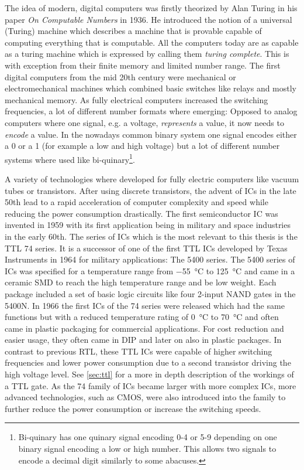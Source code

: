 The idea of modern, digital computers was firstly theorized by Alan Turing in his paper \emph{On Computable Numbers} in 1936. \cite{10.1112/plms/s2-42.1.230}
He introduced the notion of a universal (Turing) machine which describes a machine that is provable capable of computing everything that is computable.
All the computers today are as capable as a turing machine which is expressed by calling them \emph{turing complete}.
This is with exception from their finite memory and limited number range.
The first digital computers from the mid 20th century were mechanical or electromechanical machines which combined basic switches like relays and mostly mechanical memory.
As fully electrical computers increased the switching frequencies, a lot of different number formats where emerging:
Opposed to analog computers where one signal, e.g. a voltage, \emph{represents} a value, it now needs to \emph{encode} a value.
In the nowadays common binary system one signal encodes either a 0 or a 1 (for example a low and high voltage) but a lot of different number systems where used like bi-quinary\footnote{Bi-quinary has one quinary signal encoding 0-4 or 5-9 depending on one binary signal encoding a low or high number. This allows two signals to encode a decimal digit similarly to some abacuses.}.

A variety of technologies where developed for fully electric computers like vacuum tubes or transistors.
After using discrete transistors, the advent of \glspl{IC} in the late 50th lead to a rapid acceleration of computer complexity and speed while reducing the power consumption drastically.
The first semiconductor \gls{IC} was invented in 1959 \cite[p. 221]{winston1998media} with its first application being in military and space industries in the early 60th.
The series of \glspl{IC} which is the most relevant to this thesis is the \gls{TTL} 74 series.
It is a successor of one of the first \gls{TTL} \glspl{IC} developed by Texas Instruments in 1964 for military applications: The 5400 series. \cite{ICs}
The 5400 series of \glspl{IC} was specified for a temperature range from \qty{-55}{\celsius} to \qty{+125}{\celsius} and came in a ceramic \gls{SMD} to reach the high temperature range and be low weight.
Each package included a set of basic logic circuits like four 2-input NAND gates in the 5400N.
In 1966 the first \glspl{IC} of the 74 series were released which had the same functions but with a reduced temperature rating of \qty{0}{\celsius} to \qty{+70}{\celsius} and often came in plastic packaging for commercial applications.
For cost reduction and easier usage, they often came in \gls{DIP} and later on also in plastic packages.
In contrast to previous \gls{RTL}, these \gls{TTL} \glspl{IC} were capable of higher switching frequencies and lower power consumption due to a second transistor driving the high voltage level.
See \cref{sec:ttl} for a more in depth description of the workings of a \gls{TTL} gate.
As the 74 family of \glspl{IC} became larger with more complex \glspl{IC}, more advanced technologies, such as \gls{CMOS}, were also introduced into the family to further reduce the power consumption or increase the switching speeds.

